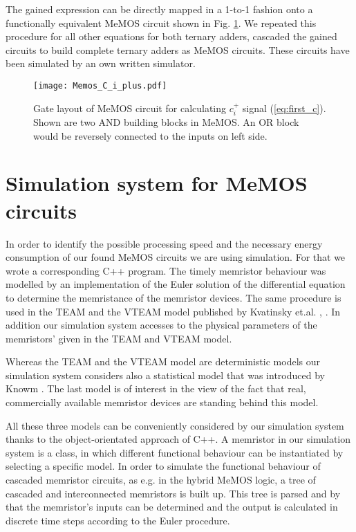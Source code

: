 \documentclass[pageno]{jpaper}
\begin{document}

The gained expression can be directly mapped in a 1-to-1 fashion onto a functionally equivalent MeMOS circuit shown in Fig. \ref{fig:MeMOS_c_plus}. We repeated this procedure for all other equations for both ternary adders, cascaded the gained circuits to build complete ternary adders as MeMOS circuits. These circuits have been simulated by an own written simulator.  

\begin{figure}[htbp]
\centering
\texttt{[image: Memos\_C\_i\_plus.pdf]}
\caption{Gate layout of MeMOS circuit for calculating $c_i^+$ signal (\ref{eq:first_c}). Shown are two AND building blocks in MeMOS. An OR block would be reversely connected to the inputs on left side.}
\label{fig:MeMOS_c_plus}
\end{figure}

\section{Simulation system for MeMOS circuits}

In order to identify the possible processing speed and the necessary energy consumption of our found MeMOS circuits we are using simulation. For that we wrote a corresponding C++ program. The timely memristor behaviour was modelled by an implementation of the Euler solution of the differential equation to determine the memristance of the memristor devices. The same procedure is used in the TEAM and the VTEAM model published by Kvatinsky et.al. \cite{Kvatinsky_TEAM}, \cite{Kvatinsky_VTEAM}. In addition our simulation system accesses to the physical parameters of the memristors' given in the TEAM and VTEAM model.

Whereas the TEAM and the VTEAM model are deterministic models our simulation system considers also a statistical model that was introduced by Knowm \cite{Knowm}. The last model is of interest in the view of the fact that real, commercially available memristor devices are standing behind this model.

All these three models can be conveniently considered by our simulation system thanks to the object-orientated approach of C++. A memristor in our simulation system is a class, in which different functional behaviour can be instantiated by selecting a specific model. In order to simulate the functional behaviour of cascaded memristor circuits, as e.g. in the hybrid MeMOS logic, a tree of cascaded and interconnected memristors is built up. This tree is parsed and by that the memristor's inputs can be determined and the output is calculated in discrete time steps according to the Euler procedure. 
\end{document}
